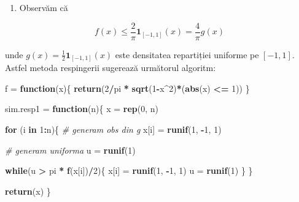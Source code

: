 \documentclass[]{article}
\newenvironment{Shaded}{\begin{snugshade}}{\end{snugshade}}
\newcommand{\KeywordTok}[1]{\textcolor[rgb]{0.13,0.29,0.53}{\textbf{#1}}}
\newcommand{\DecValTok}[1]{\textcolor[rgb]{0.00,0.00,0.81}{#1}}
\newcommand{\StringTok}[1]{\textcolor[rgb]{0.31,0.60,0.02}{#1}}
\newcommand{\CommentTok}[1]{\textcolor[rgb]{0.56,0.35,0.01}{\textit{#1}}}
\newcommand{\ControlFlowTok}[1]{\textcolor[rgb]{0.13,0.29,0.53}{\textbf{#1}}}
\newcommand{\OperatorTok}[1]{\textcolor[rgb]{0.81,0.36,0.00}{\textbf{#1}}}
\newcommand{\NormalTok}[1]{#1}
\providecommand{\tightlist}{%
  \setlength{\itemsep}{0pt}\setlength{\parskip}{0pt}}
\begin{document}
\begin{enumerate}
\def\labelenumi{\arabic{enumi}.}
\tightlist
\item
  Observăm că
\end{enumerate}

\[
  f(x) \leq \frac{2}{\pi}\mathbf{1}_{[-1,1]}(x) = \frac{4}{\pi}g(x)
\]

unde \(g(x) = \frac{1}{2}\mathbf{1}_{[-1,1]}(x)\) este densitatea
repartiției uniforme pe \([-1,1]\). Astfel metoda respingerii sugerează
următorul algoritm:

\begin{Shaded}
\begin{Highlighting}[]
\NormalTok{f =}\StringTok{ }\ControlFlowTok{function}\NormalTok{(x)\{}
  \KeywordTok{return}\NormalTok{(}\DecValTok{2}\OperatorTok{/}\NormalTok{pi }\OperatorTok{*}\StringTok{ }\KeywordTok{sqrt}\NormalTok{(}\DecValTok{1}\OperatorTok{-}\NormalTok{x}\OperatorTok{^}\DecValTok{2}\NormalTok{)}\OperatorTok{*}\NormalTok{(}\KeywordTok{abs}\NormalTok{(x) }\OperatorTok{<=}\StringTok{ }\DecValTok{1}\NormalTok{))}
\NormalTok{\}}

\NormalTok{sim.resp1 =}\StringTok{ }\ControlFlowTok{function}\NormalTok{(n)\{}
\NormalTok{  x =}\StringTok{ }\KeywordTok{rep}\NormalTok{(}\DecValTok{0}\NormalTok{, n)}
  
  \ControlFlowTok{for}\NormalTok{ (i }\ControlFlowTok{in} \DecValTok{1}\OperatorTok{:}\NormalTok{n)\{}
    \CommentTok{# generam obs din g}
\NormalTok{    x[i] =}\StringTok{ }\KeywordTok{runif}\NormalTok{(}\DecValTok{1}\NormalTok{, }\OperatorTok{-}\DecValTok{1}\NormalTok{, }\DecValTok{1}\NormalTok{)}
    
    \CommentTok{# generam uniforma}
\NormalTok{    u =}\StringTok{ }\KeywordTok{runif}\NormalTok{(}\DecValTok{1}\NormalTok{)}
    
    \ControlFlowTok{while}\NormalTok{(u }\OperatorTok{>}\StringTok{ }\NormalTok{pi }\OperatorTok{*}\StringTok{ }\KeywordTok{f}\NormalTok{(x[i])}\OperatorTok{/}\DecValTok{2}\NormalTok{)\{}
\NormalTok{      x[i] =}\StringTok{ }\KeywordTok{runif}\NormalTok{(}\DecValTok{1}\NormalTok{, }\OperatorTok{-}\DecValTok{1}\NormalTok{, }\DecValTok{1}\NormalTok{)    }
\NormalTok{      u =}\StringTok{ }\KeywordTok{runif}\NormalTok{(}\DecValTok{1}\NormalTok{)}
\NormalTok{    \}}
\NormalTok{  \}}
  
  \KeywordTok{return}\NormalTok{(x)}
\NormalTok{\}}
\end{Highlighting}
\end{Shaded}
\end{document}
